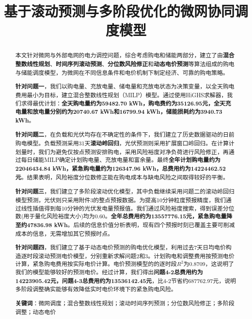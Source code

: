 \documentclass[UTF8]{ctexart}
\title{基于滚动预测与多阶段优化的微网协同调度模型}
\author{}
\date{}
\begin{document}
    
    \maketitle
    
    \pagestyle{empty}
    
    \begin{abstract}
        
        本文针对微网与外部电网的电力调控问题，综合考虑购电和储能两部分，建立了由\textbf{混合整数线性规划}、\textbf{时间序列滚动预测}、\textbf{分位数风险修正}和\textbf{动态电价预测}等算法组成的购电与储能调度模型，为微网在不同信息条件和电价机制下制定经济、可靠的购电策略。\par
        
        \indent \textbf{针对问题一}，我们以购电量、充放电量、储电量和充放电状态为决策变量，以全天购电费用最小为目标，建立混合整数线性规划（MILP）模型。通过使用HiGHS求解器，我们求得最优计划：\textbf{全天购电量约为59482.70 kWh，购电费约为35126.95元，全天充电量和放电量分别约为20740.67 kWh和16799.94 kWh，储能损耗约为3940.73 kWh}。\par
        
        \indent \textbf{针对问题二}，在负载和光伏均存在不确定性的条件下，我们建立了历史数据驱动的日前购电模型。负载预测采用31天\textbf{滚动岭回归}，光伏预测则采用扩展窗口岭回归。在计算计划量时，我们为避免仅按点预测安排购电，采用风险裕度对净负荷进行风险修正，再通过每日储能MILP确定计划购电量、充放电量和富余量。最终\textbf{全年计划购电量约为22046434.84 kWh，紧急购电量约为126347.96 kWh，总费用约为14224462.52元}。结果表明，风险裕度分位数修正能在购电成本与缺电风险之间取得较好的平衡。\par
        
        \indent \textbf{针对问题三}，我们建立了多阶段滚动优化模型，其中负载继续采用问题二的滚动岭回归模型预测，光伏则只采用附件3的整点预报数据。为提高10分钟粒度预报精度，我们通过线性插值得到每10分钟的光伏发电量预报值。我们通过风险裕度搜索，得到误差分位数(用于量化风险裕度大小)均为0.60。\textbf{全年总费用约为13557776.15元，紧急购电量降至约47836.98 kWh}。后续的信息价值分析表明，现有四个预报时刻已覆盖主要可削减成本的信息，无需增加其它预报时点。\par
        
        \indent \textbf{针对问题四}，我们建立了基于动态电价预测的购电优化模型，利用过去7天日均电价构造逐时段滚动预测电价模型，分别重新求解问题2和3。计划购电和调整费用按预测电价计算，紧急购电费用按实际电价计算。电价预测模型的的逐时段$R^2$为0.8709，这说明了我们的模型能够较好的预测电价。经过计算，我们得出\textbf{问题4-2总费用约为14223905.42元，问题4-3总费用约为13536142.45元}，比4-2节省约687762.97元，说明多阶段调整确实能够有效降低实时电价环境下的紧急购电风险。\par
        
        \noindent \textbf{关键词}：微网调度；混合整数线性规划；滚动时间序列预测；分位数风险修正；多阶段调整；动态电价
        
    \end{abstract}
    
\end{document}
